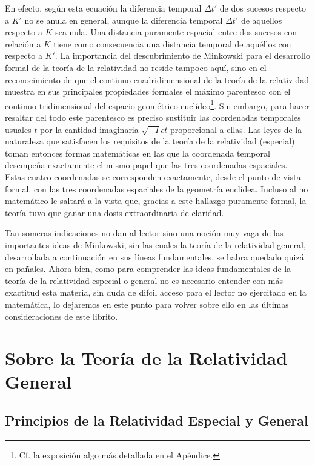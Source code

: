 \documentclass[spanish]{book}
\begin{document}
En efecto, según esta ecuación la diferencia temporal $\Delta t'$ de dos sucesos respecto a $K'$
no se anula en general, aunque la diferencia temporal $\Delta t'$ de aquellos respecto a $K$ sea
nula. Una distancia puramente espacial entre dos sucesos con relación a $K$ tiene como
consecuencia una distancia temporal de aquéllos con respecto a $K'$. La importancia del
descubrimiento de Minkowski para el desarrollo formal de la teoría de la relatividad no
reside tampoco aquí, sino en el reconocimiento de que el continuo cuadridimensional
de la teoría de la relatividad muestra en sus principales propiedades formales el
máximo parentesco con el continuo tridimensional del espacio geométrico euclídeo\footnote{
Cf. la exposición algo más detallada en el Apéndice.}. 
Sin embargo, para hacer resaltar del todo este parentesco es preciso sustituir las
coordenadas temporales usuales $t$ por la cantidad imaginaria $\sqrt{-I}ct$ 
proporcional a ellas. Las leyes de la naturaleza que satisfacen los requisitos de la
teoría de la relatividad (especial) toman entonces formas matemáticas en las que la
coordenada temporal desempeña exactamente el mismo papel que las tres
coordenadas espaciales. Estas cuatro coordenadas se corresponden exactamente, desde
el punto de vista formal, con las tres coordenadas espaciales de la geometría euclídea.
Incluso al no matemático le saltará a la vista que, gracias a este hallazgo puramente
formal, la teoría tuvo que ganar una dosis extraordinaria de claridad.

Tan someras indicaciones no dan al lector sino una noción muy vaga de las
importantes ideas de Minkowski, sin las cuales la teoría de la relatividad general,
desarrollada a continuación en sus líneas fundamentales, se habra quedado quizá en
pañales. Ahora bien, como para comprender las ideas fundamentales de la teoría de la
relatividad especial o general no es necesario entender con más exactitud esta materia,
sin duda de difcil acceso para el lector no ejercitado en la matemática, lo dejaremos
en este punto para volver sobre ello en las últimas consideraciones de este librito.




\part{Sobre la Teoría de la Relatividad General}


\chapter{Principios de la Relatividad Especial y General}
\end{document}
